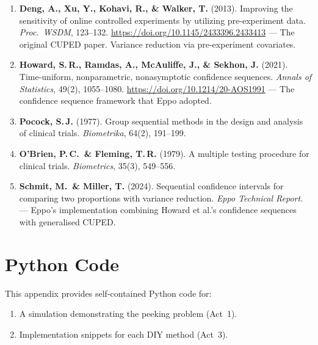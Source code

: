 \documentclass[12pt, a4paper]{article}
\begin{document}
\begin{enumerate}
  \item \textbf{Deng, A., Xu, Y., Kohavi, R., \& Walker, T.} (2013).
        Improving the sensitivity of online controlled experiments by
        utilizing pre-experiment data.
        \textit{Proc.\ WSDM}, 123--132.
        \url{https://doi.org/10.1145/2433396.2433413}
        --- The original CUPED paper.  Variance reduction via pre-experiment
        covariates.

  \item \textbf{Howard, S.\,R., Ramdas, A., McAuliffe, J., \& Sekhon, J.}
        (2021).
        Time-uniform, nonparametric, nonasymptotic confidence sequences.
        \textit{Annals of Statistics}, 49(2), 1055--1080.
        \url{https://doi.org/10.1214/20-AOS1991}
        --- The confidence sequence framework that Eppo adopted.

  \item \textbf{Pocock, S.\,J.} (1977).
        Group sequential methods in the design and analysis of clinical
        trials.
        \textit{Biometrika}, 64(2), 191--199.

  \item \textbf{O'Brien, P.\,C.\ \& Fleming, T.\,R.} (1979).
        A multiple testing procedure for clinical trials.
        \textit{Biometrics}, 35(3), 549--556.

  \item \textbf{Schmit, M.\ \& Miller, T.} (2024).
        Sequential confidence intervals for comparing two proportions with
        variance reduction.
        \textit{Eppo Technical Report}.
        --- Eppo's implementation combining Howard et al.'s confidence
        sequences with generalised CUPED.
\end{enumerate}


\newpage
\appendix
\section{Python Code}

This appendix provides self-contained Python code for:
\begin{enumerate}[nosep]
  \item A simulation demonstrating the peeking problem (Act~1).
  \item Implementation snippets for each DIY method (Act~3).
\end{enumerate}
\end{document}
